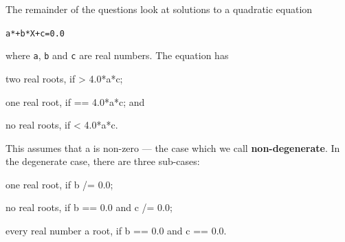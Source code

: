 \medskip
\noindent
\label{quadratics}
The remainder of the questions look at solutions to a
quadratic equation
\begin{alltt}
a* + b*X + c = 0.0
\end{alltt}
where \texttt{a}, \texttt{b} and \texttt{c} are real numbers.
The equation has 
\begin{titemize}
\item two real roots, if {\mi {} > 4.0*a*c};
\item one real root, if {\mi {} == 4.0*a*c}; and
\item no real roots, if {\mi {} < 4.0*a*c}.
\end{titemize}
This assumes that {\mi a} is non-zero --- the case which we call
\textbf{non-degenerate}. In the degenerate case, there are three sub-cases:
\begin{titemize}
\item one real root, if {\mi b /= 0.0};
\item no real roots, if {\mi b == 0.0} and {\mi c /= 0.0};
\item every real number a root, if {\mi b == 0.0} and {\mi c == 0.0}.
\end{titemize}

